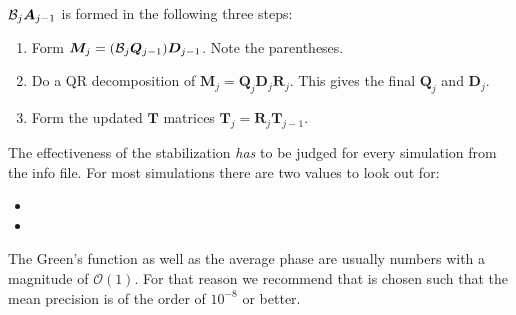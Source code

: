 ${\cal \bm{B}}_j \bm{A}_{j-1}$ is formed in the following three steps:
\begin{enumerate}
\item Form $ \bm{M}_j = ({\cal \bm{B}}_j \bm{Q}_{j-1}) \bm{D}_{j-1}$. Note the parentheses.
\item Do a QR decomposition of $\bm{M}_j = \bm{Q}_j \bm{D}_j \bm{R}_j$. This gives the final $\bm{Q}_j$ and $\bm{D}_j$.
\item Form the updated $\bm{T}$ matrices $\bm{T}_j = \bm{R}_j \bm{T}_{j-1}$.
\end{enumerate}
The effectiveness of the stabilization \emph{has} to be judged for every simulation from the info
file. For most simulations there are two values to look out for:
\begin{itemize}
\item {}
\item {}
\end{itemize}
The Green's function as well as the average phase are usually numbers with a magnitude of $\mathcal{O} (1)$. 
For that reason we recommend that  is chosen such that the mean precision is of the order of $10^{-8}$ or better.  
